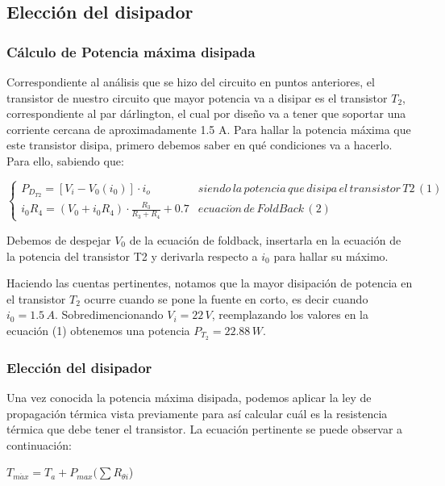 \documentclass[e2_tp1_main.tex]{subfiles}
\begin{document}
\subsection{Elección del disipador}

\subsubsection{Cálculo de Potencia máxima disipada }

Correspondiente al análisis que se hizo del circuito en puntos anteriores,
el transistor de nuestro circuito que mayor potencia va a disipar
es el transistor $T_{2}$, correspondiente al par dárlington, el cual
por diseño va a tener que soportar una corriente cercana de aproximadamente
1.5 A. Para hallar la potencia máxima que este transistor disipa,
primero debemos saber en qué condiciones va a hacerlo. Para ello,
sabiendo que:
\begin{center}
$\begin{cases}
P_{D_{T2}}=[V_{i}-V_{0}(i_{0})]\cdot i_{o}\, & siendo\,la\,potencia\,que\,disipa\,el\,transistor\,T2\,(1)\\
i_{0}R_{4}=(V_{0}+i_{0}R_{4})\cdot\frac{R_{3}}{R_{3}+R_{4}}+0.7 & ecuaci\acute{o}n\,de\,FoldBack\,(2)
\end{cases}$
\par\end{center}

Debemos de despejar $V_{0}$ de la ecuación de foldback, insertarla
en la ecuación de la potencia del transistor T2 y derivarla respecto
a $i_{0}$ para hallar su máximo.

Haciendo las cuentas pertinentes, notamos que la mayor disipación
de potencia en el transistor $T_{2}$ ocurre cuando se pone la fuente
en corto, es decir cuando $i_{0}=1.5\,A$. Sobredimencionando $V_{i}=22\,V$,
reemplazando los valores en la ecuación (1) obtenemos una potencia
$P_{T_{2}}=22.88\,W$.
\subsubsection{Elección del disipador}

Una vez conocida la potencia máxima disipada, podemos aplicar la ley
de propagación térmica vista previamente para así calcular cuál es
la resistencia térmica que debe tener el transistor. La ecuación pertinente
se puede observar a continuación:
\begin{center}
{\large{}$T_{m\acute{a}x}=T_{a}+P_{max}(\sum R_{\theta i}$)}{\large\par}
\par\end{center}
\end{document}
